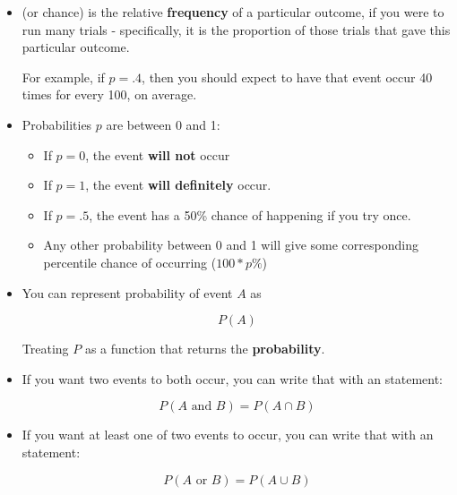     \begin{itemize}
        \item {} (or chance) is the relative \textbf{frequency} of a particular outcome, if you were to run many trials - specifically, it is the proportion of those trials that gave this particular outcome.
        
        For example, if $p=.4$, then you should expect to have that event occur 40 times for every 100, on average.
        
        \item Probabilities $p$ are between 0 and 1: 
            \begin{itemize}
                \item If $p=0$, the event \textbf{will not} occur%
                \item If $p=1$, the event \textbf{will definitely} occur.
                \item If $p=.5$, the event has a 50\% chance of happening if you try once.
                \item Any other probability between 0 and 1 will give some corresponding percentile chance of occurring ($100*p\%$)
            \end{itemize}
            
        \item You can represent probability of event $A$ as
        
            \begin{equation}
                P(A)
            \end{equation}
            
            Treating $P$ as a function that returns the \textbf{probability}.
        
        \item If you want two events to both occur, you can write that with an  statement:
        
            \begin{equation}
                P(A \text{ and } B) = P(A \cap B)
            \end{equation}
            
        \item If you want at least one of two events to occur, you can write that with an  statement:
        
            \begin{equation}
                P(A \text{ or } B) = P(A \cup B)
            \end{equation}
            

\end{itemize}
